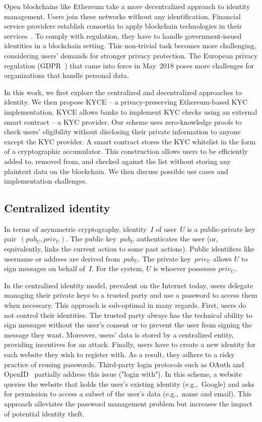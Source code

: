 Open blockchains like Ethereum take a more decentralized approach to identity management.
Users join these networks without any identification.
Financial service providers establish consortia to apply blockchain technologies in their services~\cite{EEA2017, Hyperledger, R3}.
To comply with regulation, they have to handle government-issued identities in a blockchain setting.
This non-trivial task becomes more challenging, considering users' demands for stronger privacy protection.
The European privacy regulation (GDPR~\cite{GDPR16}) that came into force in May~2018 poses more challenges for organizations that handle personal data.

In this work, we first explore the centralized and decentralized approaches to identity.
We then propose KYCE -- a privacy-preserving Ethereum-based KYC implementation.
KYCE allows banks to implement KYC checks using an external smart contract -- a KYC provider.
Our scheme uses zero-knowledge proofs to check users' eligibility without disclosing their private information to anyone except the KYC provider.
A smart contract stores the KYC whitelist in the form of a cryptographic accumulator.
This construction allows users to be efficiently added to, removed from, and checked against the list without storing any plaintext data on the blockchain.
We then discuss possible use cases and implementation challenges.

\subsection{Centralized identity}

In terms of asymmetric cryptography, identity~$I$ of user~$U$ is a public-private key pair~$(pub_U, priv_U)$.
The public key~$pub_U$ authenticates the user (or, equivalently, links the current action to some past actions).
Public identifiers like username or address are derived from~$pub_U$.
The private key~$priv_U$ allows $U$ to sign messages on behalf of~$I$.
For the system, $U$ is whoever possesses $priv_U$.

In the centralized identity model, prevalent on the Internet today, users delegate managing their private keys to a trusted party and use a password to access them when necessary.
This approach is sub-optimal in many regards.
First, users do not control their identities.
The trusted party always has the technical ability to sign messages without the user's consent or to prevent the user from signing the message they want.
Moreover, users' data is stored by a centralized entity, providing incentives for an attack.
Finally, users have to create a new identity for each website they wish to register with.
As a result, they adhere to a risky practice of reusing passwords.
Third-party login protocols such as OAuth and OpenID~\cite{Dodanduwa2018} partially address this issue ("login with").
In this scheme, a website queries the website that holds the user's existing identity (e.g.,~Google) and asks for permission to access a subset of the user's data (e.g.,~name and email).
This approach alleviates the password management problem but increases the impact of potential identity theft.

